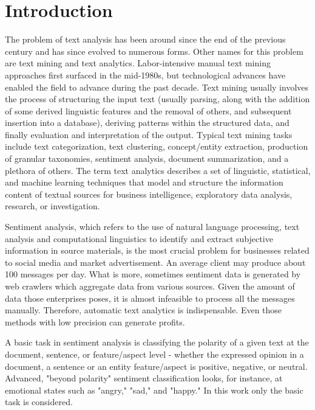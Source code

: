 \documentclass[12pt]{report}
\begin{document}
\renewcommand{\bibname}{References}
\setcounter{tocdepth}{1}

\setcounter{page}{2}

\large

\thispagestyle{empty}
\tableofcontents

\chapter*{Introduction}

The problem of text analysis has been around since the end of the previous century and has since evolved to numerous forms. Other names for this problem are text mining and text analytics. Labor-intensive manual text mining approaches first surfaced in the mid-1980s, but technological advances have enabled the field to advance during the past decade. Text mining usually involves the process of structuring the input text (usually parsing, along with the addition of some derived linguistic features and the removal of others, and subsequent insertion into a database), deriving patterns within the structured data, and finally evaluation and interpretation of the output. Typical text mining tasks include text categorization, text clustering, concept/entity extraction, production of granular taxonomies, sentiment analysis, document summarization, and a plethora of others.
The term text analytics describes a set of linguistic, statistical, and machine learning techniques that model and structure the information content of textual sources for business intelligence, exploratory data analysis, research, or investigation.

Sentiment analysis, which refers to the use of natural language processing, text analysis and computational linguistics to identify and extract subjective information in source materials, is the most crucial problem for businesses related to social media and market advertisement. An average client may produce about 100 messages per day. What is more, sometimes sentiment data is generated by web crawlers which aggregate data from various sources. Given the amount of data those enterprises poses, it is almost infeasible to process all the messages manually. Therefore, automatic text analytics is indispensable. Even those methods with low precision can generate profits.

A basic task in sentiment analysis is classifying the polarity of a given text at the document, sentence, or feature/aspect level - whether the expressed opinion in a document, a sentence or an entity feature/aspect is positive, negative, or neutral. Advanced, "beyond polarity" sentiment classification looks, for instance, at emotional states such as "angry," "sad," and "happy." In this work only the basic task is considered.
\end{document}
